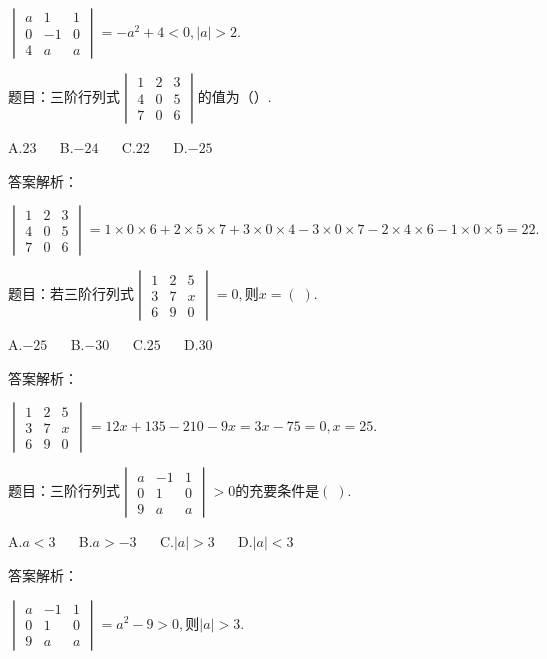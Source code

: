 $\begin{vmatrix}a&1&1\\0&-1&0\\4&a&a\end{vmatrix}=-a^2+4<0,\left|a\right|>2.$



题目：$\mathrm{三阶行列式}\begin{vmatrix}1&2&3\\4&0&5\\7&0&6\end{vmatrix}\mathrm{的值为}（）.$

A.$23$ $\quad$ B.$-24$ $\quad$ C.$22$ $\quad$ D.$-25$

答案解析：

$\begin{vmatrix}1&2&3\\4&0&5\\7&0&6\end{vmatrix}=1\times0\times6+2\times5\times7+3\times0\times4-3\times0\times7-2\times4\times6-1\times0\times5=22.$



题目：$\mathrm{若三阶行列式}\begin{vmatrix}1&2&5\\3&7&x\\6&9&0\end{vmatrix}=0,则x=(\;).$

A.$-25$ $\quad$ B.$-30$ $\quad$ C.$25$ $\quad$ D.$30$

答案解析：

$\begin{vmatrix}1&2&5\\3&7&x\\6&9&0\end{vmatrix}=12x+135-210-9x=3x-75=0,x=25.$



题目：$\mathrm{三阶行列式}\begin{vmatrix}a&-1&1\\0&1&0\\9&a&a\end{vmatrix}>0\mathrm{的充要条件是}(\;).$

A.$a<3$ $\quad$ B.$a>-3$ $\quad$ C.$\left|a\right|>3$ $\quad$ D.$\left|a\right|<3$

答案解析：

$\begin{vmatrix}a&-1&1\\0&1&0\\9&a&a\end{vmatrix}=a^2-9>0,则\left|a\right|>3.$



